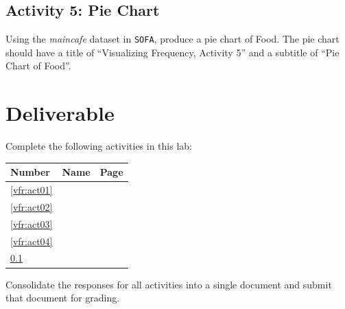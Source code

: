 \subsection{Activity 5: Pie Chart} \label{vfr:act05}

Using the \textit{maincafe} dataset in \texttt{SOFA}, produce a pie chart of Food. The pie chart should have a title of ``Visualizing Frequency, Activity 5'' and a subtitle of ``Pie Chart of Food''.

\section{Deliverable}

Complete the following activities in this lab:

\begin{center}
  \begin{tabular}{lll}
    \hline 
    \textbf{Number} & \textbf{Name} & \textbf{Page} \\ 
    \hline 
    \ref{vfr:act01} & \nameref{vfr:act01} & \pageref{vfr:act01} \\ 
    \ref{vfr:act02} & \nameref{vfr:act02} & \pageref{vfr:act02} \\ 
    \ref{vfr:act03} & \nameref{vfr:act03} & \pageref{vfr:act03} \\ 
    \ref{vfr:act04} & \nameref{vfr:act04} & \pageref{vfr:act04} \\ 
    \ref{vfr:act05} & \nameref{vfr:act05} & \pageref{vfr:act05} \\ 
    \hline 
  \end{tabular} 
\end{center}

Consolidate the responses for all activities into a single document and submit that document for grading.






